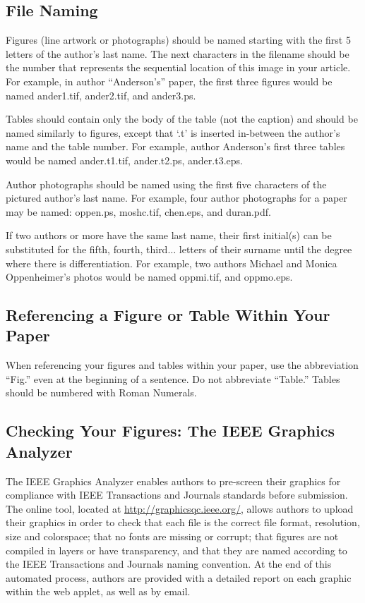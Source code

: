 \documentclass[journal,twoside,web]{ieeecolor}
\begin{document}
\subsection{File Naming}
Figures (line artwork or photographs) should be named starting with the 
first 5 letters of the author's last name. The next characters in the 
filename should be the number that represents the sequential 
location of this image in your article. For example, in author 
``Anderson's'' paper, the first three figures would be named ander1.tif, 
ander2.tif, and ander3.ps.

Tables should contain only the body of the table (not the caption) and 
should be named similarly to figures, except that `.t' is inserted 
in-between the author's name and the table number. For example, author 
Anderson's first three tables would be named ander.t1.tif, ander.t2.ps, 
ander.t3.eps.

Author photographs should be named using the first five characters of the 
pictured author's last name. For example, four author photographs for a 
paper may be named: oppen.ps, moshc.tif, chen.eps, and duran.pdf.

If two authors or more have the same last name, their first initial(s) can 
be substituted for the fifth, fourth, third$\ldots$ letters of their surname 
until the degree where there is differentiation. For example, two authors 
Michael and Monica Oppenheimer's photos would be named oppmi.tif, and 
oppmo.eps.

\subsection{Referencing a Figure or Table Within Your Paper}
When referencing your figures and tables within your paper, use the 
abbreviation ``Fig.'' even at the beginning of a sentence. Do not abbreviate 
``Table.'' Tables should be numbered with Roman Numerals.

\subsection{Checking Your Figures: The IEEE Graphics Analyzer}
The IEEE Graphics Analyzer enables authors to pre-screen their graphics for 
compliance with IEEE Transactions and Journals standards before submission. 
The online tool, located at
\underline{http://graphicsqc.ieee.org/}, allows authors to 
upload their graphics in order to check that each file is the correct file 
format, resolution, size and colorspace; that no fonts are missing or 
corrupt; that figures are not compiled in layers or have transparency, and 
that they are named according to the IEEE Transactions and Journals naming 
convention. At the end of this automated process, authors are provided with 
a detailed report on each graphic within the web applet, as well as by 
email.
\end{document}
